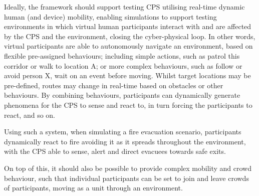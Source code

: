 Ideally, the framework should support testing CPS utilising real-time dynamic human (and device) mobility, enabling simulations to support testing environments in which virtual human participants interact with and are affected by the CPS and the environment, closing the cyber-physical loop. In other words, virtual participants are able to autonomously navigate an environment, based on flexible pre-assigned behaviours; including simple actions, such as patrol this corridor or walk to location A; or more complex behaviours, such as follow or avoid person X, wait on an event before moving. Whilst target locations may be pre-defined, routes may change in real-time based on obstacles or other behaviours. By combining behaviours, participants can dynamically generate phenomena for the CPS to sense and react to, in turn forcing the participants to react, and so on. 

Using such a system, when simulating a fire evacuation scenario, participants dynamically react to fire avoiding it as it spreads throughout the environment, with the CPS able to sense, alert and direct evacuees towards safe exits.

On top of this, it should also be possible to provide complex mobility and crowd behaviour, such that individual participants can be set to join and leave crowds of participants, moving as a unit through an environment.




